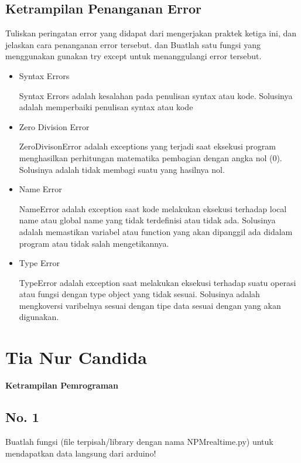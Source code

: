 \subsection{Ketrampilan Penanganan Error}
Tuliskan peringatan error yang didapat dari mengerjakan praktek ketiga ini, dan jelaskan cara penanganan error tersebut. dan Buatlah satu fungsi yang menggunakan gunakan try except untuk menanggulangi error tersebut.
\begin{itemize}
\item Syntax Errors

Syntax Errors adalah kesalahan pada penulisan syntax atau kode. Solusinya adalah memperbaiki penulisan syntax atau kode

\item Zero Division Error

ZeroDivisonError adalah exceptions yang terjadi saat eksekusi program menghasilkan perhitungan matematika pembagian dengan angka nol (0). Solusinya adalah tidak membagi suatu yang hasilnya nol.

\item Name Error

NameError adalah exception saat kode melakukan eksekusi terhadap local name atau global name yang tidak terdefinisi atau tidak ada. Solusinya adalah memastikan variabel atau function yang akan dipanggil ada didalam program atau tidak salah mengetikannya.

\item Type Error

TypeError adalah exception saat melakukan eksekusi terhadap suatu operasi atau fungsi dengan type object yang tidak sesuai. Solusinya adalah mengkoversi varibelnya sesuai dengan tipe data sesuai dengan yang akan digunakan.

\end{itemize}


\section{Tia Nur Candida}
{\Large \textbf{Ketrampilan Pemrograman}}
\subsection{ No. 1}
Buatlah  fungsi  (file  terpisah/library  dengan  nama  NPMrealtime.py)  untuk mendapatkan data langsung dari arduino!


